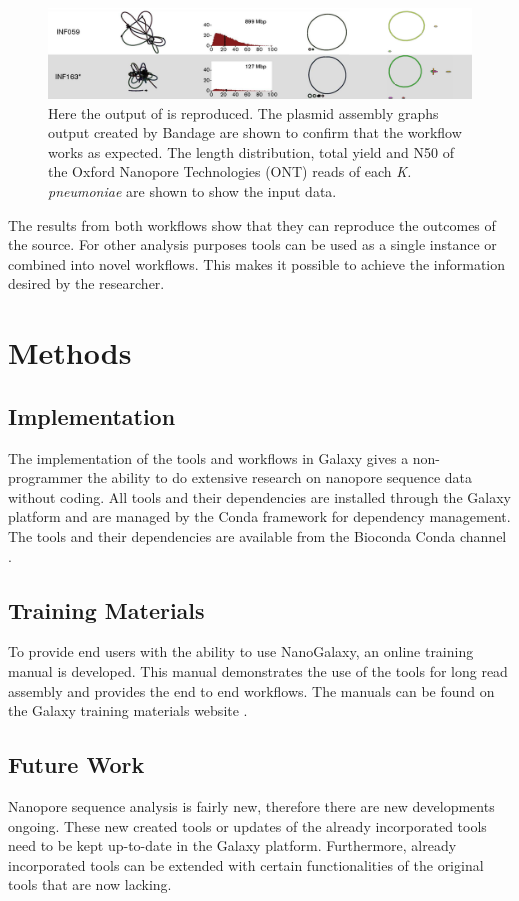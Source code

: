 \documentclass[a4paper,num-refs]{oup-contemporary}
\begin{document}
\begin{figure}[bt!]
\centering
\includegraphics[width=\linewidth]{images/unicycler_result.png}
	\caption{Here the output of \citet{Wick2017} is reproduced. The plasmid assembly graphs output created by Bandage are shown to confirm that the workflow works as expected. The length distribution, total yield and N50 of the Oxford Nanopore Technologies (ONT) reads of each \textit{K. pneumoniae} are shown to show the input data.}\label{figure:WickEtAl}
\end{figure}

The results from both workflows show that they can reproduce the outcomes of the source. For other analysis purposes tools can be used as a single instance or combined into novel workflows. This makes it possible to achieve the information desired by the researcher.

\section{Methods}
\subsection{Implementation}
The implementation of the tools and workflows in Galaxy gives a non-programmer the ability to do extensive research on nanopore sequence data without coding. All tools and their dependencies are installed through the Galaxy platform and are managed by the Conda framework for dependency management. The tools and their dependencies are available from the Bioconda Conda channel \cite{Gruning2018}.

\subsection{Training Materials}
To provide end users with the ability to use NanoGalaxy, an online training manual is developed. This manual demonstrates the use of the tools for long read assembly and provides the end to end workflows. The manuals can be found on the Galaxy training materials website \cite{Batut2018}.  

\subsection{Future Work}
Nanopore sequence analysis is fairly new, therefore there are new developments ongoing. These new created tools or updates of the already incorporated tools need to be kept up-to-date in the Galaxy platform. Furthermore, already incorporated tools can be extended with certain functionalities of the original tools that are now lacking.   
\end{document}
